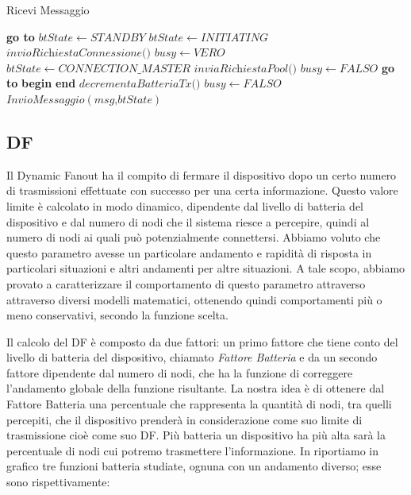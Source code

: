 \bigskip
\begin{algorithm}[th]
	\caption{Ricevi Messaggio}\label{alg:ricevi_msg}
	\begin{algorithmic}[1]
			\State \textbf{go to} 
		\EndIf
		\Label {}
		\State $\textit{btState} \gets STANDBY$
		\State $\textit{btState} \gets INITIATING$
		\Label {}
		\State $ \textit{invioRichiestaConnessione()}$
		\State $ \textit{busy} \gets VERO$
		\State $ \textit{btState} \gets CONNECTION\_MASTER $
		\State $ \textit{inviaRichiestaPool()}$
			\State $ \textit{busy} \gets FALSO$ 
			\State \textbf{go to} 
		\EndIf
		\State \textbf{begin}
			\State{}
		\State \textbf{end}
		\State $ \textit{decrementaBatteriaTx()} $
		\State $ \textit{busy} \gets FALSO$
		\State $ \textit{InvioMessaggio}\left(\textit{msg,btState}\right)  $
		\EndFunction
	\end{algorithmic}
\end{algorithm}
\bigskip

\subsection{\acf{DF}}
Il Dynamic Fanout ha il compito di fermare il dispositivo dopo un certo numero di trasmissioni effettuate con successo per una certa informazione. Questo valore limite è calcolato in modo dinamico, dipendente dal livello di batteria del dispositivo e dal numero di nodi che il sistema riesce a percepire, quindi al numero di nodi ai quali può potenzialmente connettersi. Abbiamo voluto che questo parametro avesse un particolare andamento e rapidità di risposta in particolari situazioni e altri andamenti per altre situazioni. A tale scopo, abbiamo provato a caratterizzare il comportamento di questo parametro attraverso attraverso diversi modelli matematici, ottenendo quindi comportamenti più o meno conservativi, secondo la funzione scelta.

Il calcolo del DF è composto da due fattori: un primo fattore che tiene conto del livello di batteria del dispositivo, chiamato \textit{Fattore Batteria} e da un secondo fattore dipendente dal numero di nodi, che ha la funzione di correggere l'andamento globale della funzione risultante. La nostra idea è di ottenere dal Fattore Batteria una percentuale che rappresenta la quantità di nodi, tra quelli percepiti, che il dispositivo prenderà in considerazione come suo limite di trasmissione cioè come suo DF. Più batteria un dispositivo ha più alta sarà la percentuale di nodi cui potremo trasmettere l'informazione. In  riportiamo in grafico tre funzioni batteria studiate, ognuna con un andamento diverso; esse sono rispettivamente:

